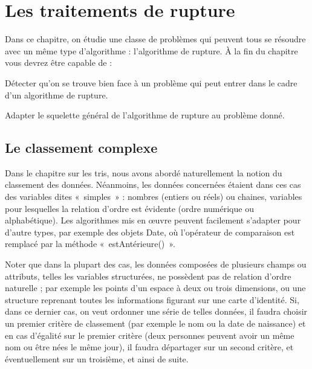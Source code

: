 \chapter{Les traitements de rupture}


Dans ce chapitre, on étudie une classe de problèmes qui peuvent tous se
résoudre avec un même type d'algorithme :
l'algorithme de rupture. À la fin du chapitre vous
devrez être capable de :

\begin{liste}
	\item 
		Détecter qu'on se trouve bien face à un problème qui
		peut entrer dans le cadre d'un algorithme de rupture.
	\item 
		Adapter le squelette général de l'algorithme de rupture
		au problème donné.
\end{liste}


\section{Le classement complexe}

Dans le chapitre sur les tris, nous avons abordé naturellement la notion
du classement des données. Néanmoins, les données concernées étaient
dans ces cas des variables dites «~simples~» : nombres (entiers ou
réels) ou chaines, variables pour lesquelles la relation d’ordre est
évidente (ordre numérique ou alphabétique). Les algorithmes mis en
œuvre peuvent facilement s’adapter pour d’autre types, par exemple des
objets Date, où l’opérateur de comparaison est remplacé par la méthode
«~estAntérieure()~».

Noter que dans la plupart des cas, les données composées de plusieurs
champs ou attributs, telles les variables structurées, ne possèdent pas
de relation d’ordre naturelle ; par exemple les points d’un espace à
deux ou trois dimensions, ou une structure reprenant toutes les
informations figurant sur une carte d’identité. Si, dans ce dernier
cas, on veut ordonner une série de telles données, il faudra choisir un
premier critère de classement (par exemple le nom ou la date de
naissance) et en cas d’égalité sur le premier critère (deux personnes
peuvent avoir un même nom ou être nées le même jour), il faudra
départager sur un second critère, et éventuellement sur un troisième,
et ainsi de suite.

